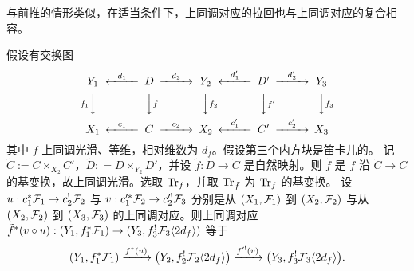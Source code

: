 与前推的情形类似，在适当条件下，上同调对应的拉回也与上同调对应的复合相容。
\begin{lem}
\label{AL:pullback compatible with composition}
假设有交换图
\[
\begin{CD}
Y_1@<d_1<<D@>d_2>>Y_2@<d'_1<<D'@>d'_2>>Y_3\\
@Vf_1VV@VVfV@VVf_2V@VVf'V@VVf_3V\\
X_1@<c_1<< C@>c_2>> X_2@<c'_1<< C'@>c'_2>> X_3
\end{CD}
\]
其中 $f$ 上同调光滑、等维，相对维数为 $d_f$。假设第三个内方块是笛卡儿的。
记 $\widetilde C := C \times_{X_2} C'$，$\widetilde D: = D \times_{Y_2} D'$，并设 $\tilde f:\tilde D\to\tilde C$ 是自然映射。则 $\tilde f$ 是 $f$ 沿 $\tilde C\to C$ 的基变换，故上同调光滑。选取 ${\operatorname{Tr}}_f$，并取 ${\operatorname{Tr}}_{\tilde f}$ 为 ${\operatorname{Tr}}_f$ 的基变换。
设 $u: c_1^*\mathcal{F}_1 \to c_2^!\mathcal{F}_2$ 与 $v: c'^*_1\mathcal{F}_2 \to c'^!_2 \mathcal{F}_3$ 分别是从 $(X_1, \mathcal{F}_1)$ 到 $(X_2, \mathcal{F}_2)$ 与从 $(X_2, \mathcal{F}_2)$ 到 $(X_3, \mathcal{F}_3)$ 的上同调对应。则上同调对应 $\tilde f^*(v\circ u): (Y_1, f_1^*\mathcal{F}_1) \to (Y_3, f_3^!\mathcal{F}_3\langle 2d_f\rangle )$ 等于
\[
(Y_1, f_1^*\mathcal{F}_1) \xrightarrow{f^*(u)} \big(Y_2, f_2^!\mathcal{F}_2\langle 2d_f\rangle \big) \xrightarrow{f'^!(v)} \big(Y_3, f_3^!\mathcal{F}_3\langle 2d_f\rangle \big).
\]
\end{lem}
